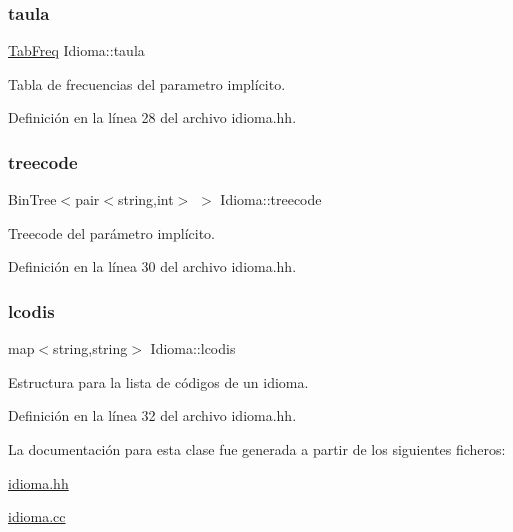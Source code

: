 \subsubsection{\texorpdfstring{taula}{taula}}
{\footnotesize\ttfamily \hyperlink{class_tab_freq}{Tab\+Freq} Idioma\+::taula\hspace{0.3cm}{\ttfamily [private]}}



Tabla de frecuencias del parametro implícito. 



Definición en la línea 28 del archivo idioma.\+hh.

\mbox{\label{class_idioma_a5eeaf73b2498503c5c686ac259e1f675}} 
\subsubsection{\texorpdfstring{treecode}{treecode}}
{\footnotesize\ttfamily Bin\+Tree$<$pair$<$string,int$>$ $>$ Idioma\+::treecode\hspace{0.3cm}{\ttfamily [private]}}



Treecode del parámetro implícito. 



Definición en la línea 30 del archivo idioma.\+hh.

\mbox{\label{class_idioma_ab908f7375f4506b26dd3cd163bc0b8cd}} 
\subsubsection{\texorpdfstring{lcodis}{lcodis}}
{\footnotesize\ttfamily map$<$string,string$>$ Idioma\+::lcodis\hspace{0.3cm}{\ttfamily [private]}}



Estructura para la lista de códigos de un idioma. 



Definición en la línea 32 del archivo idioma.\+hh.



La documentación para esta clase fue generada a partir de los siguientes ficheros\+:\begin{DoxyCompactItemize}
\item 
\hyperlink{idioma_8hh}{idioma.\+hh}\item 
\hyperlink{idioma_8cc}{idioma.\+cc}\end{DoxyCompactItemize}
